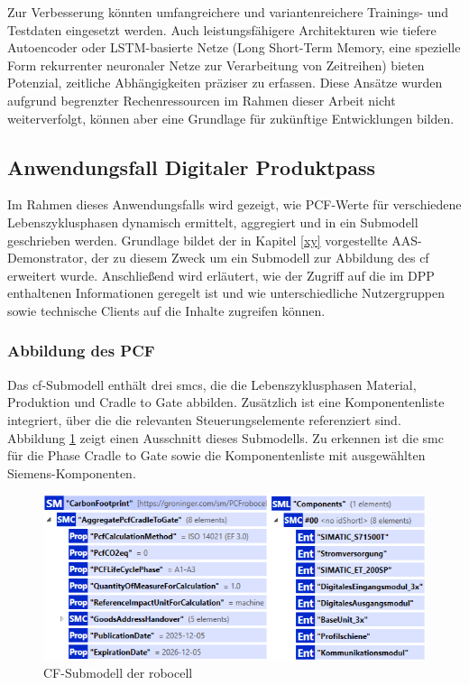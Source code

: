 Zur Verbesserung könnten umfangreichere und variantenreichere Trainings- und Testdaten eingesetzt werden. 
Auch leistungsfähigere Architekturen wie tiefere Autoencoder oder LSTM-basierte Netze (Long Short-Term Memory, eine spezielle Form rekurrenter neuronaler Netze zur Verarbeitung von Zeitreihen) bieten Potenzial, zeitliche Abhängigkeiten präziser zu erfassen.
Diese Ansätze wurden aufgrund begrenzter Rechenressourcen im Rahmen dieser Arbeit nicht weiterverfolgt, können aber eine Grundlage für zukünftige Entwicklungen bilden.

\newpage
\subsection{Anwendungsfall Digitaler Produktpass}
Im Rahmen dieses Anwendungsfalls wird gezeigt, wie PCF-Werte für verschiedene Lebenszyklusphasen dynamisch ermittelt, aggregiert und in ein Submodell geschrieben werden. 
Grundlage bildet der in Kapitel \ref{xy} vorgestellte AAS-Demonstrator, der zu diesem Zweck um ein Submodell zur Abbildung des \acs{cf} erweitert wurde.
Anschließend wird erläutert, wie der Zugriff auf die im DPP enthaltenen Informationen geregelt ist und wie unterschiedliche Nutzergruppen sowie technische Clients auf die Inhalte zugreifen können.

\subsubsection{Abbildung des PCF}
Das \acs{cf}-Submodell enthält drei \acsp{smc}, die die Lebenszyklusphasen Material, Produktion und Cradle to Gate abbilden.
Zusätzlich ist eine Komponentenliste integriert, über die die relevanten Steuerungselemente referenziert sind.
Abbildung \ref{fig:SubmodellCF} zeigt einen Ausschnitt dieses Submodells.
Zu erkennen ist die \acs{smc} für die Phase Cradle to Gate sowie die Komponentenliste mit ausgewählten Siemens-Komponenten.

\begin{figure}[htbp]
    \centering
        \includegraphics[width=1\textwidth]{Bilder/Ergebnisse/DPP/SubmodellCF.png}
    \caption{CF-Submodell der robocell}
    \label{fig:SubmodellCF}
\end{figure}

